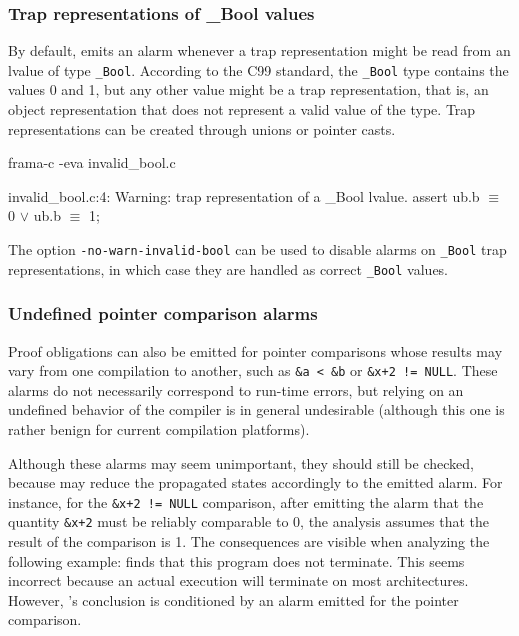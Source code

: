 \documentclass{frama-c-book}
\newcommand{\isoc}{\textsf{C99}}
\begin{document}
\subsubsection{Trap representations of \_Bool values}

By default, \Eva{} emits an alarm whenever a trap representation might be read
from an lvalue of type \texttt{\_Bool}.
According to the \isoc{} standard, the \texttt{\_Bool} type contains
the values 0 and 1, but any other value might be a trap representation, that is,
an object representation that does not represent a valid value of the type.
Trap representations can be created through unions or pointer casts.

\begin{frama-c-commands}
frama-c -eva invalid_bool.c
\end{frama-c-commands}
\begin{logs}
   invalid_bool.c:4: Warning:
    trap representation of a _Bool lvalue. assert ub.b $\equiv$ 0 $\vee$ ub.b $\equiv$ 1;
\end{logs}

The option \lstinline|-no-warn-invalid-bool| can be used to disable alarms
on \texttt{\_Bool} trap representations, in which case they are handled as
correct \texttt{\_Bool} values.

\subsubsection{Undefined pointer comparison alarms}
Proof obligations can also be emitted
for pointer comparisons whose results may vary
from one compilation to another, such as \lstinline|&a < &b|
or \lstinline|&x+2 != NULL|.
These alarms do not necessarily
correspond to run-time errors, but relying on an undefined
behavior of the compiler is in general undesirable (although
this one is rather benign for current compilation platforms).

Although these alarms may seem unimportant, they should still be
checked, because \Eva{} may reduce the propagated states
accordingly to the emitted alarm. For instance, for the
\lstinline|&x+2 != NULL| comparison, after emitting the alarm that the
quantity \lstinline|&x+2| must be reliably comparable to 0, the
analysis assumes that the result of the comparison is 1. The
consequences are visible when analyzing the following example:
\Eva{} finds that this program does not terminate.
This seems incorrect because an actual execution will terminate
on most architectures.
However, \Eva{}'s conclusion is conditioned by
an alarm emitted for the pointer comparison.
\end{document}
